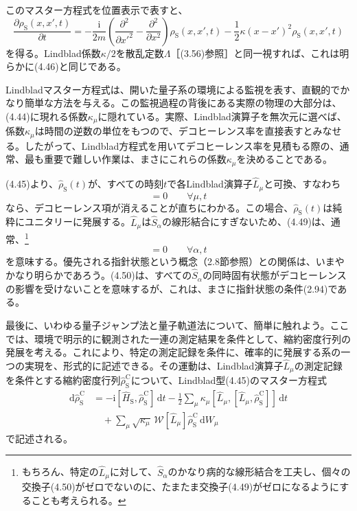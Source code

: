 \hypertarget{srcpage:168}{}\label{srcpage:168}
このマスター方程式を位置表示で表すと、
\begin{equation}
\frac{\partial\rho_{\mathrm S}(x,x',t)}{\partial t}
=-\frac{\mathrm i}{2m}\left(\frac{\partial^2}{\partial x'^2}-\frac{\partial^2}{\partial x^2}\right)\rho_{\mathrm S}(x,x',t)
-\frac12\kappa(x-x')^2\rho_{\mathrm S}(x,x',t)
\tag{4.48}
\end{equation}
を得る。Lindblad係数$\kappa/2$を散乱定数$\Lambda$［(3.56)参照］と同一視すれば、これは明らかに(4.46)と同じである。

Lindbladマスター方程式は、開いた量子系の環境による監視を表す、直観的でかなり簡単な方法を与える。この監視過程の背後にある実際の物理の大部分は、(4.44)に現れる係数$\kappa_\mu$に隠れている。実際、Lindblad演算子を無次元に選べば、係数$\kappa_\mu$は時間の逆数の単位をもつので、デコヒーレンス率を直接表すとみなせる。したがって、Lindblad方程式を用いてデコヒーレンス率を見積もる際の、通常、最も重要で難しい作業は、まさにこれらの係数$\kappa_\mu$を決めることである。

(4.45)より、$\hat\rho_{\mathrm S}(t)$が、すべての時刻$t$で各Lindblad演算子$\hat L_\mu$と可換、すなわち
\begin{equation}
[\hat L_\mu,\hat\rho_{\mathrm S}(t)]=0\qquad\forall\mu,t
\tag{4.49}
\end{equation}
なら、デコヒーレンス項が消えることが直ちにわかる。この場合、$\hat\rho_{\mathrm S}(t)$は純粋にユニタリーに発展する。$\hat L_\mu$は$\hat S_\alpha$の線形結合にすぎないため、(4.49)は、通常、\footnote{もちろん、特定の$\hat L_\mu$に対して、$\hat S_\alpha$のかなり病的な線形結合を工夫し、個々の交換子(4.50)がゼロでないのに、たまたま交換子(4.49)がゼロになるようにすることも考えられる。}
\begin{equation}
[\hat S_\alpha,\hat\rho_{\mathrm S}(t)]=0\qquad\forall\alpha,t
\tag{4.50}
\end{equation}
を意味する。優先される指針状態という概念（2.8節参照）との関係は、いまやかなり明らかであろう。(4.50)は、すべての$\hat S_\alpha$の同時固有状態がデコヒーレンスの影響を受けないことを意味するが、これは、まさに指針状態の条件(2.94)である。

最後に、いわゆる量子ジャンプ法と量子軌道法について、簡単に触れよう。ここでは、環境で明示的に観測された一連の測定結果を条件として、縮約密度行列の発展を考える。これにより、特定の測定記録を条件に、確率的に発展する系の一つの実現を、形式的に記述できる。その運動は、Lindblad演算子$\hat L_\mu$の測定記録を条件とする縮約密度行列$\hat\rho^{\mathrm C}_{\mathrm S}$について、Lindblad型(4.45)のマスター方程式
\begin{equation}
\begin{aligned}
\mathrm d\hat\rho^{\mathrm C}_{\mathrm S}
&=-\mathrm i[\hat H_{\mathrm S},\hat\rho^{\mathrm C}_{\mathrm S}]\,\mathrm dt
-\frac12\sum_\mu\kappa_\mu[\hat L_\mu,[\hat L_\mu,\hat\rho^{\mathrm C}_{\mathrm S}]]\,\mathrm dt\\
&\quad+\sum_\mu\sqrt{\kappa_\mu}\,\mathcal W[\hat L_\mu]\hat\rho^{\mathrm C}_{\mathrm S}\,\mathrm dW_\mu
\end{aligned}\tag{4.51}
\end{equation}
で記述される。

